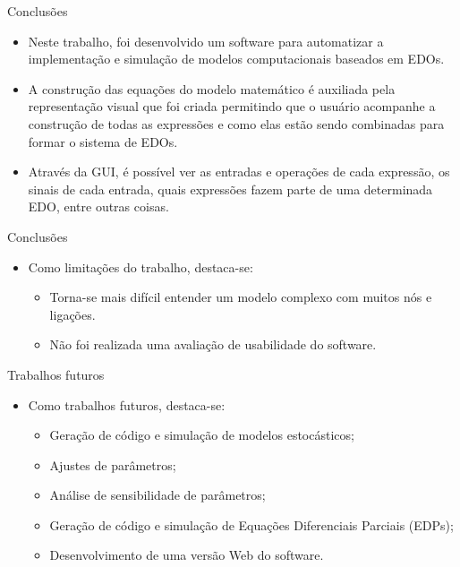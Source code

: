 \begin{frame}{Conclusões}
    \begin{itemize}
        \item Neste trabalho, foi desenvolvido um software para automatizar a implementação e simulação de modelos computacionais baseados em EDOs.
        \item A construção das equações do modelo matemático é auxiliada pela representação visual que foi criada permitindo que o usuário acompanhe a construção de todas as expressões e como elas estão sendo combinadas para formar o sistema de EDOs.
        \item Através da GUI, é possível ver as entradas e operações de cada expressão, os sinais de cada entrada, quais expressões fazem parte de uma determinada EDO, entre outras coisas. 
    \end{itemize}
\end{frame}

\begin{frame}{Conclusões}
    \begin{itemize}
        \item Como limitações do trabalho, destaca-se: 
        \begin{itemize}
            \item Torna-se mais difícil entender um modelo complexo com muitos nós e ligações. 
            \item Não foi realizada uma avaliação de usabilidade do software. 
        \end{itemize}
    \end{itemize}
\end{frame}

\begin{frame}{Trabalhos futuros}
    \begin{itemize}
        \item Como trabalhos futuros, destaca-se: 
        \begin{itemize}
            \item Geração de código e simulação de modelos estocásticos;
            \item Ajustes de parâmetros; 
            \item Análise de sensibilidade de parâmetros;
            \item Geração de código e simulação de Equações Diferenciais Parciais (EDPs);
            \item Desenvolvimento de uma versão Web do software.
        \end{itemize}
    \end{itemize}
\end{frame}